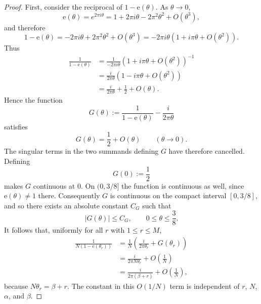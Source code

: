 \documentclass[11pt]{amsart}
\numberwithin{equation}{section}
\newcommand{\et}[1]{\mathrm e\!\left(#1\right)}
\begin{document}
\begin{proof}
First, consider the reciprocal of $1-\mathrm{e}\!\left(\theta\right)$. As $%
\theta\to0$, 
\begin{equation*}
\mathrm{e}\!\left(\theta\right)=e^{2\pi i\theta} =1+2\pi
i\theta-2\pi^2\theta^2+O(\theta^3),
\end{equation*}
and therefore 
\begin{equation*}
1-\mathrm{e}\!\left(\theta\right) =-2\pi i\theta+2\pi^2\theta^2+O(\theta^3)
=-2\pi i\theta\left(1+i\pi\theta+O(\theta^2)\right).
\end{equation*}
Thus 
\begin{equation*}
\begin{aligned} \frac1{1-\et{\theta}} &=\frac1{-2\pi i\theta}
\left(1+i\pi\theta+O(\theta^2)\right)^{-1} \\ &=\frac{i}{2\pi\theta}
\left(1-i\pi\theta+O(\theta^2)\right) \\
&=\frac{i}{2\pi\theta}+\frac12+O(\theta). \end{aligned}
\end{equation*}
Hence the function 
\begin{equation*}
G(\theta):=\frac1{1-\mathrm{e}\!\left(\theta\right)}-\frac{i}{2\pi\theta}
\end{equation*}
satisfies 
\begin{equation*}
G(\theta)=\frac12+O(\theta) \qquad (\theta\to0).
\end{equation*}
The singular terms in the two summands defining $G$ have therefore
cancelled. Defining 
\begin{equation*}
G(0):=\frac12
\end{equation*}
makes $G$ continuous at $0$. On $(0,3/8]$ the function is continuous as
well, since $\mathrm{e}\!\left(\theta\right)\neq1$ there. Consequently $G$
is continuous on the compact interval $[0,3/8]$, and so there exists an
absolute constant $C_G$ such that 
\begin{equation*}
|G(\theta)|\le C_G, \qquad 0\le \theta\le \frac38.
\end{equation*}
It follows that, uniformly for all $r$ with $1\le r\le M$, 
\begin{equation*}
\begin{aligned} \frac1{N(1-\et{\theta_r})}
&=\frac1N\left(\frac{i}{2\pi\theta_r}+G(\theta_r)\right) \\ &=\frac{i}{2\pi
N\theta_r}+O\!\left(\frac1N\right) \\
&=\frac{i}{2\pi(\beta+r)}+O\!\left(\frac1N\right), \end{aligned}
\end{equation*}
because $N\theta_r=\beta+r$. The constant in this $O(1/N)$ term is
independent of $r$, $N$, $\alpha$, and $\beta$.


\end{proof}
\end{document}
